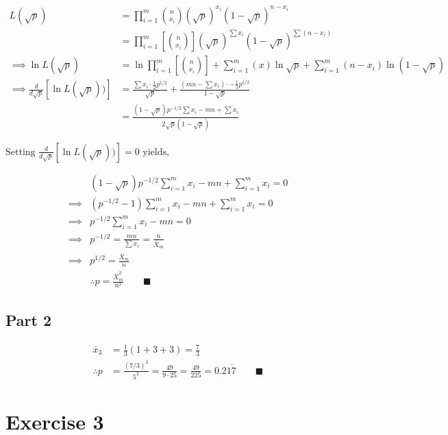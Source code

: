 \documentclass{article}
\begin{document}
$$
\begin{aligned}
L(\sqrt{ p }) &= \prod_{i=1}^{m} \binom{n}{x_{i}} (\sqrt{ p })^{x_{i}}(1-\sqrt{ p })^{n-x_{i}} \\
&= \prod_{i=1}^m \left[ \binom{n}{x_{i}}\right] (\sqrt{ p })^{\sum x_{i}}(1-\sqrt{ p })^{\sum (n-x_{i})} \\
\implies \ln{L(\sqrt{ p })} &= \ln{\prod_{i=1}^m \left[ \binom{n}{x_{i}}\right]} + \sum_{i=1}^m{(x)}\ln{\sqrt{ p }}+\sum_{i=1}^m{(n-x_{i})}\ln{(1-\sqrt{p})} \\
\implies \frac{d}{d\sqrt{ p }}[\ln{L(\sqrt{ p })})] &= \frac{\sum x_{i} \cdot \frac{1}{2} p^{1/2}}{\sqrt{ p }} + \frac{\left( mn - \sum x_{i} \right) \cdot -\frac{1}{2} p^{1/2}}{1 - \sqrt{ p }} \\
&= \frac{(1-\sqrt{ p })p^{-1/2} \sum x_{i} - mn + \sum x_{i}}{2\sqrt{ p } (1-\sqrt{ p })}
\end{aligned}
$$

$\text{Setting } \frac{d}{d\sqrt{ p }}[\ln{L(\sqrt{ p })})]  = 0 \text{ yields,}$

$$
\begin{aligned}
&(1-\sqrt{ p })p^{-1/2} \sum_{i=1}^m x_{i} - mn + \sum_{i=1}^m x_{i} = 0 \\
\implies &(p^{-1/2} - 1) \sum_{i=1}^m x_{i} - mn + \sum_{i=1}^m x_{i} = 0 \\
\implies &p^{-1/2} \sum_{i=1}^m x_{i} - mn = 0 \\
\implies &p^{-1/2} = \frac{mn}{\sum x_{i}} = \frac{n}{\bar{X}_{m}} \\
\implies &p^{1/2} = \frac{\bar{X}_{m}}{n} \\
& \therefore p = \frac{\bar{X}_{m}^2}{n^2} \qquad \blacksquare
\end{aligned}
$$

\subsection*{Part 2}
$$
\begin{aligned}
\bar{x}_{3} &= \frac{1}{3} (1 + 3 + 3) = \frac{7}{3} \\
\therefore p &= \frac{(7/3)^2}{5^2} = \frac{49}{9 \cdot 25} = \frac{49}{225} = 0.21\dot{7} \qquad \blacksquare
\end{aligned}
$$


\newpage
\section*{Exercise 3}
\end{document}

